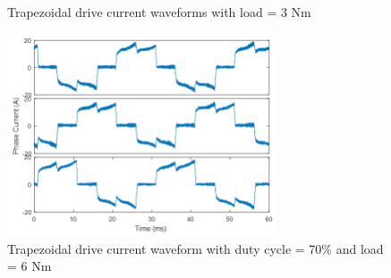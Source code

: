 \begin{figure}[h!p]
\centering

\caption{Trapezoidal drive current waveforms with load = 3 Nm}
\label{fig:trap_c3}
\end{figure}

\begin{figure}[h!p]
\centering
\includegraphics[width=8cm]{Images/waveforms/trap_curr_9.png} 
\caption[trapc9]{Trapezoidal drive current waveform with duty cycle = 70\% and load = 6 Nm}
\label{fig:trap_c4}
\end{figure}

